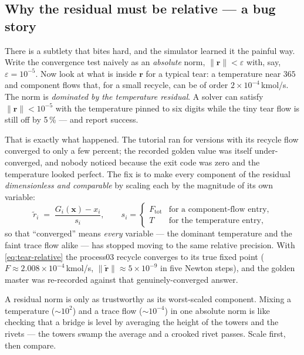 \documentclass[11pt,a4paper]{article}
\begin{document}
\subsection{Why the residual must be relative --- a bug story}

There is a subtlety that bites hard, and the simulator learned it the
painful way.  Write the convergence test naively as an
\emph{absolute} norm, $\|\mathbf{r}\| < \varepsilon$ with, say,
$\varepsilon = 10^{-5}$.  Now look at what is inside $\mathbf{r}$ for a
typical tear: a temperature near $365$ and component flows that, for a
small recycle, can be of order $2\times 10^{-4}$\,kmol/s.  The norm is
\emph{dominated by the temperature residual}.  A solver can satisfy
$\|\mathbf{r}\| < 10^{-5}$ with the temperature pinned to six digits
while the tiny tear flow is still off by 5\,\% --- and report success.

That is exactly what happened.  The  tutorial
ran for versions with its recycle flow converged to only a few
percent; the recorded golden value was itself under-converged, and
nobody noticed because the exit code was zero and the temperature
looked perfect.  The fix is to make every component of the residual
\emph{dimensionless and comparable} by scaling each by the magnitude
of its own variable:
\begin{equation}
   \boxed{\;
   \tilde r_i \;=\; \frac{G_i(\mathbf{x}) - x_i}{s_i},
   \qquad
   s_i = \begin{cases}
            F_{\text{tot}} & \text{for a component-flow entry},\\[2pt]
            T              & \text{for the temperature entry},
         \end{cases}
   \;}
   \label{eq:tear-relative}
\end{equation}
so that ``converged'' means \emph{every} variable --- the dominant
temperature and the faint trace flow alike --- has stopped moving to
the same relative precision.  With \eqref{eq:tear-relative} the
process03 recycle converges to its true fixed point
($F \approx 2.008\times 10^{-4}$\,kmol/s, $\|\tilde{\mathbf{r}}\|
\approx 5\times 10^{-9}$ in five Newton steps), and the golden master
was re-recorded against that genuinely-converged answer.

\begin{intuition}
A residual norm is only as trustworthy as its worst-scaled component.
Mixing a temperature ($\sim 10^{2}$) and a trace flow ($\sim 10^{-4}$)
in one absolute norm is like checking that a bridge is level by
averaging the height of the towers and the rivets --- the towers
swamp the average and a crooked rivet passes.  Scale first, then
compare.
\end{intuition}
\end{document}
